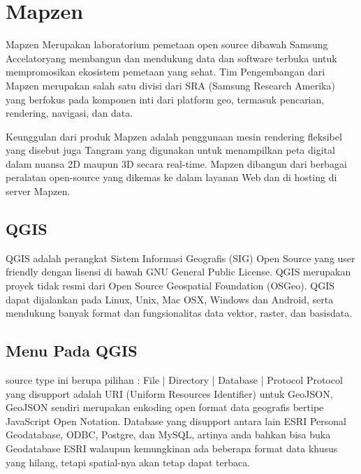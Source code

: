 \section{Mapzen}
Mapzen Merupakan laboratorium pemetaan open source dibawah Samsung Accelatoryang membangun dan mendukung data dan software terbuka untuk mempromosikan ekosistem pemetaan yang sehat. Tim Pengembangan dari Mapzen merupakan salah satu divisi dari SRA (Samsung Research Amerika) yang berfokus pada komponen inti dari platform geo, termasuk pencarian, rendering, navigasi, dan data.

Keunggulan dari produk Mapzen adalah penggunaan mesin rendering fleksibel yang disebut juga Tangram yang digunakan untuk menampilkan peta digital dalam nuansa 2D maupun 3D secara real-time. Mapzen dibangun dari berbagai peralatan open-source yang dikemas ke dalam layanan Web dan di hosting di server Mapzen.

\subsection{QGIS}
QGIS adalah perangkat Sistem Informasi Geografis (SIG) Open Source yang user friendly dengan lisensi di bawah GNU General Public License. QGIS merupakan proyek tidak resmi dari Open Source Geospatial Foundation (OSGeo). QGIS dapat dijalankan pada Linux, Unix, Mac OSX, Windows dan Android, serta mendukung banyak format dan fungsionalitas data vektor, raster, dan basisdata.


\subsection{Menu Pada QGIS}
source type ini berupa pilihan :
File | Directory | Database | Protocol
Protocol yang disupport adalah URI (Uniform Resources Identifier) untuk GeoJSON, GeoJSON sendiri merupakan enkoding open format data geografis bertipe JavaScript Open Notation.
Database yang disupport antara lain ESRI Personal Geodatabase, ODBC, Postgre, dan MySQL, artinya anda bahkan bisa buka Geodatabase ESRI walaupun kemungkinan ada beberapa format data khusus yang hilang, tetapi spatial-nya akan tetap dapat terbaca.


